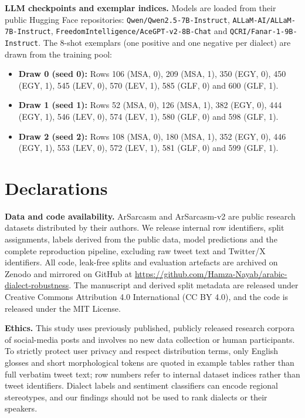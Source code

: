 \documentclass[11pt]{article}
\begin{document}
\textbf{LLM checkpoints and exemplar indices.} Models are loaded from their public Hugging Face repositories: \nolinkurl{Qwen/Qwen2.5-7B-Instruct}, \texttt{ALLaM-AI/ALLaM-7B-Instruct}, \nolinkurl{FreedomIntelligence/AceGPT-v2-8B-Chat} and \nolinkurl{QCRI/Fanar-1-9B-Instruct}. The 8-shot exemplars (one positive and one negative per dialect) are drawn from the training pool:
\begin{itemize}
\item \textbf{Draw 0 (seed 0):} Rows 106 (MSA, 0), 209 (MSA, 1), 350 (EGY, 0), 450 (EGY, 1), 545 (LEV, 0), 570 (LEV, 1), 585 (GLF, 0) and 600 (GLF, 1).
\item \textbf{Draw 1 (seed 1):} Rows 52 (MSA, 0), 126 (MSA, 1), 382 (EGY, 0), 444 (EGY, 1), 546 (LEV, 0), 574 (LEV, 1), 580 (GLF, 0) and 598 (GLF, 1).
\item \textbf{Draw 2 (seed 2):} Rows 108 (MSA, 0), 180 (MSA, 1), 352 (EGY, 0), 446 (EGY, 1), 553 (LEV, 0), 572 (LEV, 1), 581 (GLF, 0) and 599 (GLF, 1).
\end{itemize}

\FloatBarrier

\section*{Declarations}
\textbf{Data and code availability.} ArSarcasm and ArSarcasm-v2 are public research datasets distributed by their authors. We release internal row identifiers, split assignments, labels derived from the public data, model predictions and the complete reproduction pipeline, excluding raw tweet text and Twitter/X identifiers. All code, leak-free splits and evaluation artefacts are archived on Zenodo and mirrored on GitHub at \url{https://github.com/Hamza-Nayab/arabic-dialect-robustness}. The manuscript and derived split metadata are released under Creative Commons Attribution 4.0 International (CC BY 4.0), and the code is released under the MIT License.

\textbf{Ethics.} This study uses previously published, publicly released research corpora of social-media posts and involves no new data collection or human participants. To strictly protect user privacy and respect distribution terms, only English glosses and short morphological tokens are quoted in example tables rather than full verbatim tweet text; row numbers refer to internal dataset indices rather than tweet identifiers. Dialect labels and sentiment classifiers can encode regional stereotypes, and our findings should not be used to rank dialects or their speakers.
\end{document}
